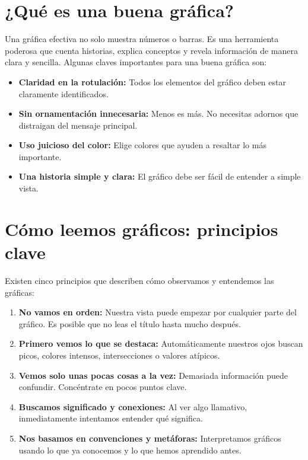 \documentclass[
  spanish,
  letterpaper,
  DIV=11,
  numbers=noendperiod]{scrreprt}
\providecommand{\tightlist}{%
  \setlength{\itemsep}{0pt}\setlength{\parskip}{0pt}}
\begin{document}
\section{¿Qué es una buena
gráfica?}\label{quuxe9-es-una-buena-gruxe1fica}

Una gráfica efectiva no solo muestra números o barras. Es una
herramienta poderosa que cuenta historias, explica conceptos y revela
información de manera clara y sencilla. Algunas claves importantes para
una buena gráfica son:

\begin{itemize}
\tightlist
\item
  \textbf{Claridad en la rotulación:} Todos los elementos del gráfico
  deben estar claramente identificados.
\item
  \textbf{Sin ornamentación innecesaria:} Menos es más. No necesitas
  adornos que distraigan del mensaje principal.
\item
  \textbf{Uso juicioso del color:} Elige colores que ayuden a resaltar
  lo más importante.
\item
  \textbf{Una historia simple y clara:} El gráfico debe ser fácil de
  entender a simple vista.
\end{itemize}

\section{Cómo leemos gráficos: principios
clave}\label{cuxf3mo-leemos-gruxe1ficos-principios-clave}

Existen cinco principios que describen cómo observamos y entendemos las
gráficas:

\begin{enumerate}
\def\labelenumi{\arabic{enumi}.}
\tightlist
\item
  \textbf{No vamos en orden:} Nuestra vista puede empezar por cualquier
  parte del gráfico. Es posible que no leas el título hasta mucho
  después.
\item
  \textbf{Primero vemos lo que se destaca:} Automáticamente nuestros
  ojos buscan picos, colores intensos, intersecciones o valores
  atípicos.
\item
  \textbf{Vemos solo unas pocas cosas a la vez:} Demasiada información
  puede confundir. Concéntrate en pocos puntos clave.
\item
  \textbf{Buscamos significado y conexiones:} Al ver algo llamativo,
  inmediatamente intentamos entender qué significa.
\item
  \textbf{Nos basamos en convenciones y metáforas:} Interpretamos
  gráficos usando lo que ya conocemos y lo que hemos aprendido antes.
\end{enumerate}
\end{document}
